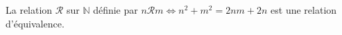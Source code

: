 La relation $\mathcal R$ sur $\mathbb N$ définie par $n\mathcal R m \iff n^2+m^2 = 2nm+2n$ est une relation d'équivalence.

\begin{reponses}
\end{reponses}

